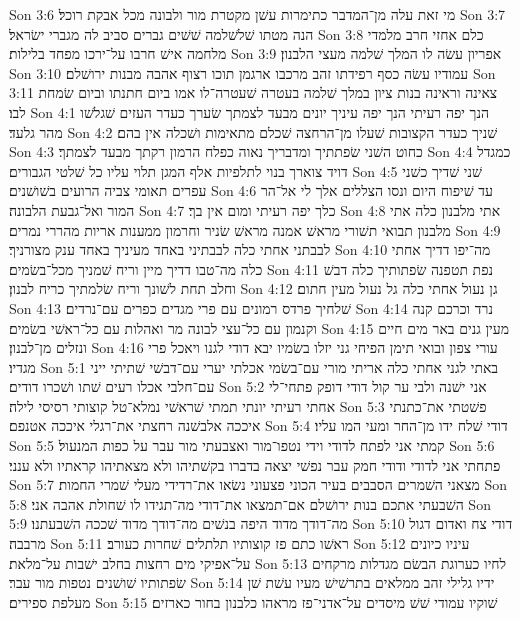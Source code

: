 Son 3:6  מי זאת עלה מן־המדבר כתימרות עשׁן מקטרת מור ולבונה מכל אבקת רוכל׃
Son 3:7  הנה מטתו שׁלשׁלמה שׁשׁים גברים סביב לה מגברי ישׂראל׃
Son 3:8  כלם אחזי חרב מלמדי מלחמה אישׁ חרבו על־ירכו מפחד בלילות׃
Son 3:9  אפריון עשׂה לו המלך שׁלמה מעצי הלבנון׃
Son 3:10  עמודיו עשׂה כסף רפידתו זהב מרכבו ארגמן תוכו רצוף אהבה מבנות ירושׁלם׃
Son 3:11  צאינה וראינה בנות ציון במלך שׁלמה בעטרה שׁעטרה־לו אמו ביום חתנתו וביום שׂמחת לבו׃
Son 4:1  הנך יפה רעיתי הנך יפה עיניך יונים מבעד לצמתך שׂערך כעדר העזים שׁגלשׁו מהר גלעד׃
Son 4:2  שׁניך כעדר הקצובות שׁעלו מן־הרחצה שׁכלם מתאימות ושׁכלה אין בהם׃
Son 4:3  כחוט השׁני שׂפתתיך ומדבריך נאוה כפלח הרמון רקתך מבעד לצמתך׃
Son 4:4  כמגדל דויד צוארך בנוי לתלפיות אלף המגן תלוי עליו כל שׁלטי הגבורים׃
Son 4:5  שׁני שׁדיך כשׁני עפרים תאומי צביה הרועים בשׁושׁנים׃
Son 4:6  עד שׁיפוח היום ונסו הצללים אלך לי אל־הר המור ואל־גבעת הלבונה׃
Son 4:7  כלך יפה רעיתי ומום אין בך׃
Son 4:8  אתי מלבנון כלה אתי מלבנון תבואי תשׁורי מראשׁ אמנה מראשׁ שׂניר וחרמון ממענות אריות מהררי נמרים׃
Son 4:9  לבבתני אחתי כלה לבבתיני באחד מעיניך באחד ענק מצורניך׃
Son 4:10  מה־יפו דדיך אחתי כלה מה־טבו דדיך מיין וריח שׁמניך מכל־בשׂמים׃
Son 4:11  נפת תטפנה שׂפתותיך כלה דבשׁ וחלב תחת לשׁונך וריח שׂלמתיך כריח לבנון׃
Son 4:12  גן נעול אחתי כלה גל נעול מעין חתום׃
Son 4:13  שׁלחיך פרדס רמונים עם פרי מגדים כפרים עם־נרדים׃
Son 4:14  נרד וכרכם קנה וקנמון עם כל־עצי לבונה מר ואהלות עם כל־ראשׁי בשׂמים׃
Son 4:15  מעין גנים באר מים חיים ונזלים מן־לבנון׃
Son 4:16  עורי צפון ובואי תימן הפיחי גני יזלו בשׂמיו יבא דודי לגנו ויאכל פרי מגדיו׃
Son 5:1  באתי לגני אחתי כלה אריתי מורי עם־בשׂמי אכלתי יערי עם־דבשׁי שׁתיתי ייני עם־חלבי אכלו רעים שׁתו ושׁכרו דודים׃
Son 5:2  אני ישׁנה ולבי ער קול דודי דופק פתחי־לי אחתי רעיתי יונתי תמתי שׁראשׁי נמלא־טל קוצותי רסיסי לילה׃
Son 5:3  פשׁטתי את־כתנתי איככה אלבשׁנה רחצתי את־רגלי איככה אטנפם׃
Son 5:4  דודי שׁלח ידו מן־החר ומעי המו עליו׃
Son 5:5  קמתי אני לפתח לדודי וידי נטפו־מור ואצבעתי מור עבר על כפות המנעול׃
Son 5:6  פתחתי אני לדודי ודודי חמק עבר נפשׁי יצאה בדברו בקשׁתיהו ולא מצאתיהו קראתיו ולא ענני׃
Son 5:7  מצאני השׁמרים הסבבים בעיר הכוני פצעוני נשׂאו את־רדידי מעלי שׁמרי החמות׃
Son 5:8  השׁבעתי אתכם בנות ירושׁלם אם־תמצאו את־דודי מה־תגידו לו שׁחולת אהבה אני׃
Son 5:9  מה־דודך מדוד היפה בנשׁים מה־דודך מדוד שׁככה השׁבעתנו׃
Son 5:10  דודי צח ואדום דגול מרבבה׃
Son 5:11  ראשׁו כתם פז קוצותיו תלתלים שׁחרות כעורב׃
Son 5:12  עיניו כיונים על־אפיקי מים רחצות בחלב ישׁבות על־מלאת׃
Son 5:13  לחיו כערוגת הבשׂם מגדלות מרקחים שׂפתותיו שׁושׁנים נטפות מור עבר׃
Son 5:14  ידיו גלילי זהב ממלאים בתרשׁישׁ מעיו עשׁת שׁן מעלפת ספירים׃
Son 5:15  שׁוקיו עמודי שׁשׁ מיסדים על־אדני־פז מראהו כלבנון בחור כארזים׃
